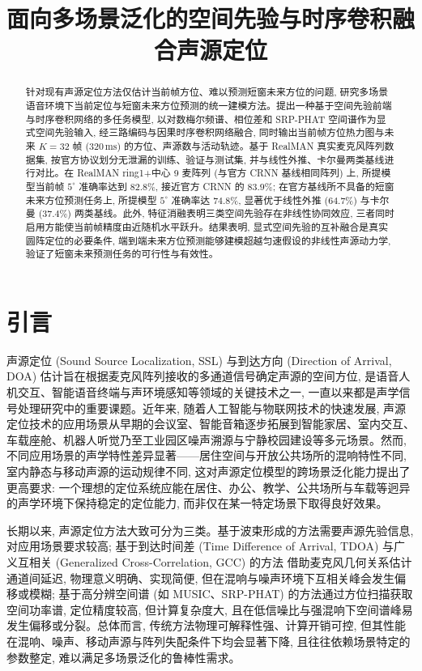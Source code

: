 \documentclass[lang=cn,a4paper,newtx]{elegantpaper}
\title{面向多场景泛化的空间先验与时序卷积融合声源定位}
\author{}
\institute{}
\date{}
\begin{document}
\maketitle

\begin{abstract}
针对现有声源定位方法仅估计当前帧方位、难以预测短窗未来方位的问题, 研究多场景语音环境下当前定位与短窗未来方位预测的统一建模方法。提出一种基于空间先验前端与时序卷积网络的多任务模型, 以对数梅尔频谱、相位差和 SRP-PHAT 空间谱作为显式空间先验输入, 经三路编码与因果时序卷积网络融合, 同时输出当前帧方位热力图与未来 $K{=}32$ 帧 ($320\,\mathrm{ms}$) 的方位、声源数与活动轨迹。基于 RealMAN 真实麦克风阵列数据集, 按官方协议划分无泄漏的训练、验证与测试集, 并与线性外推、卡尔曼两类基线进行对比。在 RealMAN ring1+中心 9 麦阵列 (与官方 CRNN 基线相同阵列) 上, 所提模型当前帧 $5^\circ$ 准确率达到 $82.8\%$, 接近官方 CRNN 的 $83.9\%$; 在官方基线所不具备的短窗未来方位预测任务上, 所提模型 $5^\circ$ 准确率达 $74.8\%$, 显著优于线性外推 ($64.7\%$) 与卡尔曼 ($37.4\%$) 两类基线。此外, 特征消融表明三类空间先验存在非线性协同效应, 三者同时启用方能使当前帧精度由近随机水平跃升。结果表明, 显式空间先验的互补融合是真实圆阵定位的必要条件, 端到端未来方位预测能够建模超越匀速假设的非线性声源动力学, 验证了短窗未来预测任务的可行性与有效性。
\end{abstract}

\section{引言}

声源定位 (Sound Source Localization, SSL) 与到达方向 (Direction of Arrival, DOA) 估计旨在根据麦克风阵列接收的多通道信号确定声源的空间方位, 是语音人机交互、智能语音终端与声环境感知等领域的关键技术之一, 一直以来都是声学信号处理研究中的重要课题。近年来, 随着人工智能与物联网技术的快速发展, 声源定位技术的应用场景从早期的会议室、智能音箱逐步拓展到智能家居、室内交互、车载座舱、机器人听觉乃至工业园区噪声溯源与宁静校园建设等多元场景。然而, 不同应用场景的声学特性差异显著——居住空间与开放公共场所的混响特性不同, 室内静态与移动声源的运动规律不同, 这对声源定位模型的跨场景泛化能力提出了更高要求: 一个理想的定位系统应能在居住、办公、教学、公共场所与车载等迥异的声学环境下保持稳定的定位能力, 而非仅在某一特定场景下取得良好效果。

长期以来, 声源定位方法大致可分为三类。基于波束形成的方法需要声源先验信息, 对应用场景要求较高; 基于到达时间差 (Time Difference of Arrival, TDOA) 与广义互相关 (Generalized Cross-Correlation, GCC) 的方法 \cite{knapp1976gcc} 借助麦克风几何关系估计通道间延迟, 物理意义明确、实现简便, 但在混响与噪声环境下互相关峰会发生偏移或模糊; 基于高分辨空间谱 (如 MUSIC、SRP-PHAT) 的方法通过方位扫描获取空间功率谱, 定位精度较高, 但计算复杂度大, 且在低信噪比与强混响下空间谱峰易发生偏移或分裂。总体而言, 传统方法物理可解释性强、计算开销可控, 但其性能在混响、噪声、移动声源与阵列失配条件下均会显著下降, 且往往依赖场景特定的参数整定, 难以满足多场景泛化的鲁棒性需求。
\end{document}
